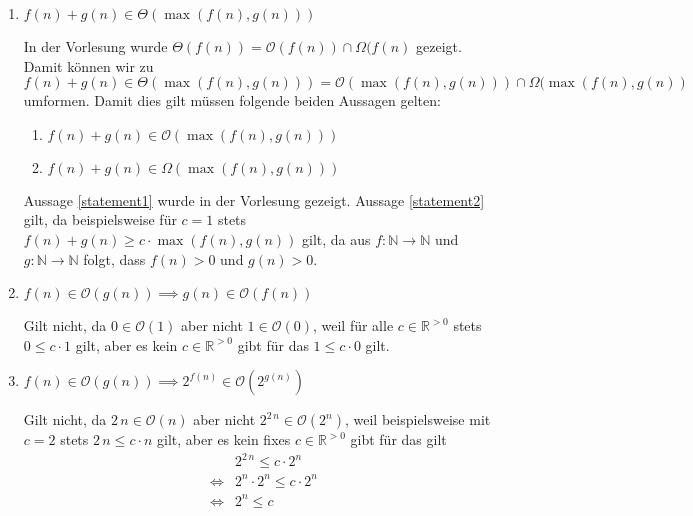 \documentclass[german]{acAssignment}
\begin{document}
\begin{enumerate}
    \item $f(n) + g(n) \in \Theta(\max(f(n), g(n)))$
    
        \begin{acSolution}
            In der Vorlesung wurde $\Theta(f(n)) = \mathcal{O}(f(n)) \cap \Omega(f(n)$ gezeigt.
            Damit können wir zu $f(n) + g(n) \in \Theta(\max(f(n), g(n))) = \mathcal{O}(\max(f(n), g(n))) \cap \Omega(\max(f(n), g(n))$ umformen.
            Damit dies gilt müssen folgende beiden Aussagen gelten:
            \begin{enumerate}[label=(\arabic*)]
            \item\label{statement1} $f(n) + g(n) \in \mathcal{O}(\max(f(n), g(n)))$
            \item\label{statement2} $f(n) + g(n) \in \Omega(\max(f(n), g(n)))$
            \end{enumerate}
            Aussage \ref{statement1} wurde in der Vorlesung gezeigt.
            Aussage \ref{statement2} gilt, da beispielsweise für $c=1$ stets $f(n) + g(n) \geq c \cdot \max(f(n), g(n))$ gilt, da aus $f:\mathbb{N} \to \mathbb{N}$ und $g:\mathbb{N} \to \mathbb{N}$ folgt, dass $f(n) > 0$ und $g(n) > 0$.
        \end{acSolution}
    
    \item $f(n) \in \mathcal{O}(g(n)) \implies g(n) \in \mathcal{O}(f(n))$
    
        \begin{acSolution}
            Gilt nicht, da $0 \in \mathcal{O}(1)$ aber nicht $1 \in \mathcal{O}(0)$, weil für alle $c \in \mathbb{R}^{>0}$ stets $0 \leq c \cdot 1$ gilt, aber es kein $c \in \mathbb{R}^{>0}$ gibt für das $1 \leq c \cdot 0$ gilt.
        \end{acSolution}
    
    \item $f(n) \in \mathcal{O}(g(n)) \implies 2^{f(n)} \in \mathcal{O}(2^{g(n)})$
    
        \begin{acSolution}
            Gilt nicht, da $2 \, n \in \mathcal{O}(n)$ aber nicht $2^{2 \, n} \in \mathcal{O}(2^n)$, weil beispielsweise mit $c = 2$ stets $2 \, n \leq c \cdot n$ gilt, aber es kein fixes $c \in \mathbb{R}^{>0}$ gibt für das gilt
            \begin{align*}
                & 2^{2 \, n} \leq c \cdot 2^n \\
                \iff & 2^n \cdot 2^n \leq c \cdot 2^n \\
                \iff & 2^n \leq c\\[-1cm]
            \end{align*}
        \end{acSolution}
    

\end{enumerate}
\end{document}
